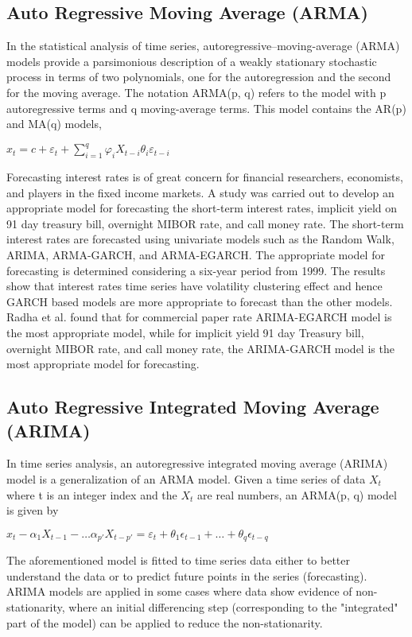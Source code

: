 \subsection{Auto Regressive Moving Average (ARMA)}

In the statistical analysis of time series, autoregressive–moving-average (ARMA) models provide a parsimonious description of a weakly stationary stochastic process in terms of two polynomials, one for the autoregression and the second for the moving average. The notation ARMA(p, q) refers to the model with p autoregressive terms and q moving-average terms. This model contains the AR(p) and MA(q) models,

\(x_t = c+\varepsilon_t+\sum^{q}_{i=1} \varphi_iX_{t-i}\theta_i\varepsilon_{t-i}\)

Forecasting interest rates is of great concern for financial researchers, economists, and players in the fixed income markets. A study was carried out to develop an appropriate model for forecasting the short-term interest rates, implicit yield on 91 day treasury bill, overnight MIBOR rate, and call money rate.\cite{Radha:2015aa} The short-term interest rates are forecasted using univariate models such as the Random Walk, ARIMA, ARMA-GARCH, and ARMA-EGARCH. The appropriate model for forecasting is determined considering a six-year period from 1999. The results show that interest rates time series have volatility clustering effect and hence GARCH based models are more appropriate to forecast than the other models. Radha et al. found that for commercial paper rate ARIMA-EGARCH model is the most appropriate model, while for implicit yield 91 day Treasury bill, overnight MIBOR rate, and call money rate, the ARIMA-GARCH model is the most appropriate model for forecasting.

\subsection{Auto Regressive Integrated Moving Average (ARIMA)}

In time series analysis, an autoregressive integrated moving average (ARIMA) model is a generalization of an ARMA model. Given a time series of data $X_t$ where t is an integer index and the $X_t$ are real numbers, an ARMA(p, q) model is given by

\(x_t - \alpha_1 X_{t-1} - \dots \alpha_{p'} X_{t-p'} = \varepsilon_t + \theta_1 \epsilon_{t-1} + \dots + \theta_q \epsilon_{t-q}\)

The aforementioned model is fitted to time series data either to better understand the data or to predict future points in the series (forecasting). ARIMA models are applied in some cases where data show evidence of non-stationarity, where an initial differencing step (corresponding to the "integrated" part of the model) can be applied to reduce the non-stationarity. 

